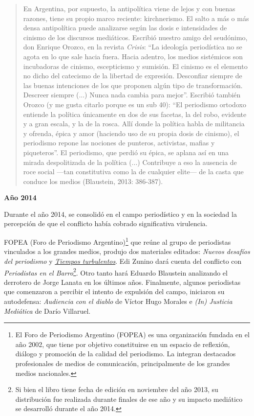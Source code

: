 \begin{quote}
En Argentina, por supuesto, la antipolítica viene de lejos y con buenas razones, tiene su propio marco reciente: kirchnerismo. El salto a más o más densa antipolítica puede analizarse según las dosis e intensidades de cinismo de los discursos mediáticos. Escribió nuestro amigo del seudónimo, don Enrique Orozco, en la revista \emph{Crisis}: \enquote{La ideología periodística no se agota en lo que sale hacia fuera. Hacia adentro, los medios sistémicos son incubadoras de cinismo, escepticismo y sumisión. El cinismo es el elemento no dicho del catecismo de la libertad de expresión. Desconfiar siempre de las buenas intenciones de los que proponen algún tipo de transformación. Descreer siempre (...) Nunca nada cambia para mejor}. Escribió también Orozco (y me gusta citarlo porque es un sub 40): \enquote{El periodismo ortodoxo entiende la política únicamente en dos de sus facetas, la del robo, evidente y a gran escala, y la de la rosca. Allí donde la política habla de militancia y ofrenda, épica y amor (haciendo uso de su propia dosis de cinismo), el periodismo repone las nociones de punteros, activistas, mafias y piqueteros}. El periodismo, que perdió su épica, se aplana así en una mirada despolitizada de la política (...) Contribuye a eso la ausencia de roce social ---tan constitutiva como la de cualquier elite--- de la casta que conduce los medios (Blaustein, 2013: 386-387).
\end{quote}

\textbf{Año 2014}

Durante el año 2014, se consolidó en el campo periodístico y en la sociedad la percepción de que el conflicto había cobrado significativa virulencia.

FOPEA (Foro de Periodismo Argentino)\footnote{El Foro de Periodismo Argentino (FOPEA) es una organización fundada en el año 2002, que tiene por objetivo constituirse en un espacio de reflexión, diálogo y promoción de la calidad del periodismo. La integran destacados profesionales de medios de comunicación, principalmente de los grandes medios nacionales.} que reúne al grupo de periodistas vinculados a los grandes medios, produjo dos materiales editados: \emph{Nuevos desafíos del periodismo} y \href{http://www.cuspide.com/9789871496990/Tiempos+Turbulentos/}{\emph{Tiempos turbulentos}}. Edi Zunino dará cuenta del conflicto con \emph{Periodistas en el Barro}\footnote{Si bien el libro tiene fecha de edición en noviembre del año 2013, su distribución fue realizada durante finales de ese año y su impacto mediático se desarrolló durante el año 2014.}. Otro tanto hará Eduardo Blaustein analizando el derrotero de Jorge Lanata en los últimos años. Finalmente, algunos periodistas que comenzaron a percibir el intento de expulsión del campo, iniciaron su autodefensa: \emph{Audiencia con el diablo} de Víctor Hugo Morales e \emph{(In) Justicia Mediática} de Darío Villaruel.

